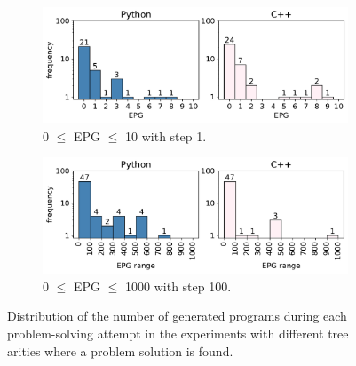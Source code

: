 \begin{figure}
\begin{subfigure}{0.5\linewidth}
\centering
\includegraphics[width=\linewidth, trim={0mm 4mm 0mm 0mm}]{images/epg_distribution_solved_maxprog_1000_1_v3_zenodo.pdf}
  \caption{0 $\leq$ EPG $\leq$ 10 with step 1.}
  \label{fig:seidr:epg-distrib-solved-10}
\end{subfigure}
\begin{subfigure}{0.5\linewidth}
\centering
\includegraphics[width=\linewidth, trim={0mm 4mm 0mm 0mm}]{images/epg_distribution_solved_maxprog_1000_100_v3_zenodo.pdf}
  \caption{0 $\leq$ EPG $\leq$ 1000 with step 100.}
  \label{fig:seidr:epg-distrib-solved-100}
\end{subfigure}
\caption{Distribution of the number of generated programs during each problem-solving attempt in the experiments with different tree arities where a problem solution is found.}
\label{fig:seidr:epg-distribution}
\end{figure}

